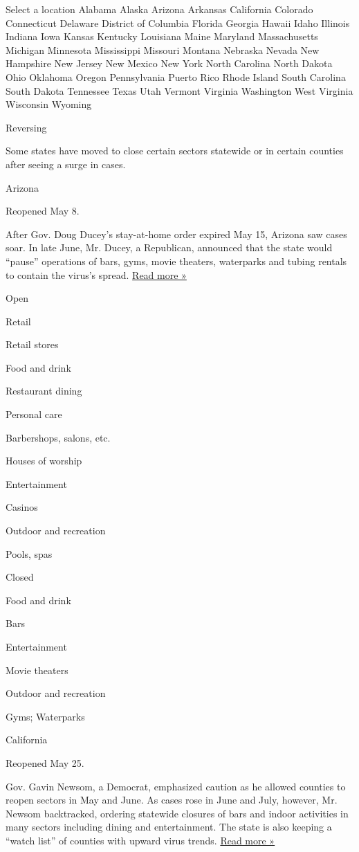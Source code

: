 Select a location Alabama Alaska Arizona Arkansas California Colorado
Connecticut Delaware District of Columbia Florida Georgia Hawaii Idaho
Illinois Indiana Iowa Kansas Kentucky Louisiana Maine Maryland
Massachusetts Michigan Minnesota Mississippi Missouri Montana Nebraska
Nevada New Hampshire New Jersey New Mexico New York North Carolina North
Dakota Ohio Oklahoma Oregon Pennsylvania Puerto Rico Rhode Island South
Carolina South Dakota Tennessee Texas Utah Vermont Virginia Washington
West Virginia Wisconsin Wyoming

Reversing

Some states have moved to close certain sectors statewide or in certain
counties after seeing a surge in cases.

Arizona

Reopened May 8.

After Gov. Doug Ducey's stay-at-home order expired May 15, Arizona saw
cases soar. In late June, Mr. Ducey, a Republican, announced that the
state would ``pause'' operations of bars, gyms, movie theaters,
waterparks and tubing rentals to contain the virus's spread.
\href{https://www.azcentral.com/story/news/local/arizona-health/2020/07/23/watch-live-ducey-provide-arizona-covid-19-update/5490927002/}{Read
more »}

Open

Retail

Retail stores

Food and drink

Restaurant dining

Personal care

Barbershops, salons, etc.

Houses of worship

Entertainment

Casinos

Outdoor and recreation

Pools, spas

Closed

Food and drink

Bars

Entertainment

Movie theaters

Outdoor and recreation

Gyms; Waterparks

California

Reopened May 25.

Gov. Gavin Newsom, a Democrat, emphasized caution as he allowed counties
to reopen sectors in May and June. As cases rose in June and July,
however, Mr. Newsom backtracked, ordering statewide closures of bars and
indoor activities in many sectors including dining and entertainment.
The state is also keeping a ``watch list'' of counties with upward virus
trends.
\href{https://www.latimes.com/projects/california-coronavirus-cases-tracking-outbreak/reopening-across-counties/}{Read
more »}

